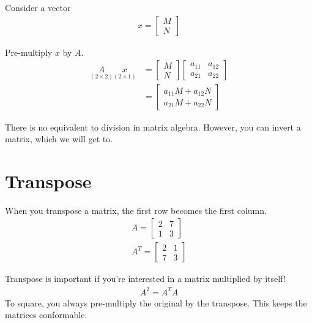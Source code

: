 \documentclass{article}
\begin{document}
Consider a vector 
\begin{align}
    x = \begin{bmatrix}
            M \\
            N
        \end{bmatrix}
\end{align}

Pre-multiply $x$ by $A$. 
\begin{align}
    \underset{(2 \times 2)}{A} \underset{(2 \times 1)}{x} &= \begin{bmatrix}
            M \\
            N
        \end{bmatrix} 
        \begin{bmatrix}
            a_{11} & a_{12} \\
            a_{21} & a_{22}
        \end{bmatrix} \\
       &= \begin{bmatrix}
           a_{11} M + a_{12}N \\
           a_{21}M + a_{22}N
       \end{bmatrix} 
\end{align}

There is no equivalent to division in matrix algebra. However, you can invert a matrix, which we will get to. 

\section{Transpose}
When you transpose a matrix, the first row becomes the first column. 
\begin{align}
    A = \begin{bmatrix}
        2 & 7 \\
        1 & 3
    \end{bmatrix}\\
    A^{T} = \begin{bmatrix}
        2 & 1 \\
        7 & 3
    \end{bmatrix}
\end{align}

Transpose is important if you're interested in a matrix multiplied by itself! 
\begin{align}
    A^2 = A^{T}A 
\end{align}
To square, you always pre-multiply the original by the transpose. This keeps the matrices conformable. 
\end{document}
